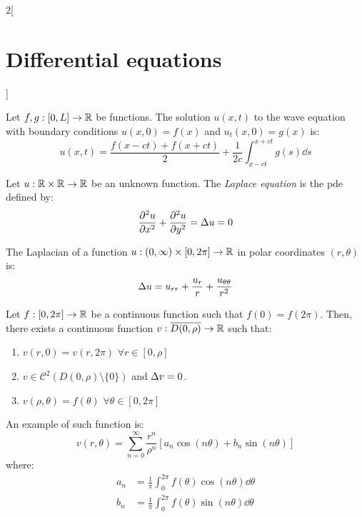 \documentclass[../../../main.tex]{subfiles}
\begin{document}
\begin{multicols}{2}[\section{Differential equations}]
\begin{proposition}
    Let $f,g:[0,L]\rightarrow\mathbb{R}$ be functions. The solution $u(x,t)$ to the wave equation with boundary conditions $u(x,0)=f(x)$ and $u_t(x,0)=g(x)$ is: $$u(x,t)=\frac{f(x-ct)+f(x+ct)}{2}+\frac{1}{2c}\int_{x-ct}^{x+ct}g(s)\dd{s}$$
  \end{proposition}
  \begin{definition}
    Let $u:\mathbb{R}\times\mathbb{R}\rightarrow\mathbb{R}$ be an unknown function. The \emph{Laplace equation} is the pde defined by: $$\pdv[2]{u}{x}+\pdv[2]{u}{y}=\Delta u=0$$
  \end{definition}
  \begin{proposition}
    The Laplacian of a function $u:(0,\infty)\times[0,2\pi]\rightarrow\mathbb{R}$ in polar coordinates $(r,\theta)$ is: $$\Delta u=u_{rr}+\frac{u_r}{r}+\frac{u_{\theta\theta}}{r^2}$$
  \end{proposition}
  \begin{proposition}
    Let $f:[0,2\pi]\rightarrow\mathbb{R}$ be a continuous function such that $f(0)=f(2\pi)$. Then, there exists a continuous function $v:\overline{D(0,\rho)}\rightarrow\mathbb{R}$ such that:
    \begin{enumerate}
      \item $v(r,0)=v(r,2\pi)$ $\forall r\in[0,\rho]$
      \item $v\in\mathcal{C}^2(D(0,\rho)\setminus\{0\})$ and $\Delta v=0$.
      \item $v(\rho,\theta)=f(\theta)$ $\forall\theta\in[0,2\pi]$
    \end{enumerate}
    An example of such function is:
    $$v(r,\theta)=\sum_{n=0}^\infty \frac{r^n}{\rho^n}\left[a_n\cos\left(n\theta\right)+ b_n\sin\left(n\theta\right)\right]$$ where:
    \begin{align*}
      a_n & =\frac{1}{\pi}\int_{0}^{2\pi} f(\theta)\cos\left(n\theta\right)\dd{\theta} \\
      b_n & =\frac{1}{\pi}\int_{0}^{2\pi} f(\theta)\sin\left(n\theta\right)\dd{\theta}
    \end{align*}
  \end{proposition}
\end{multicols}
\end{document}

